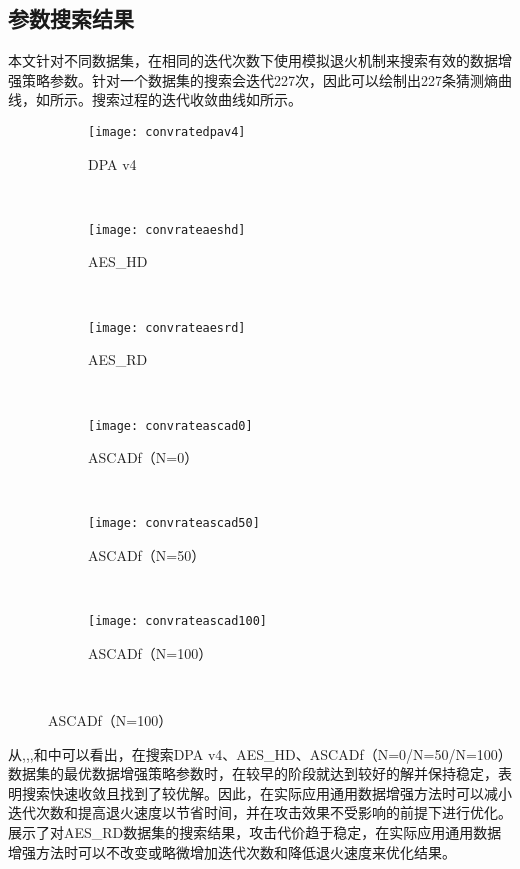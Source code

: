 {	\subsection{参数搜索结果}
	本文针对不同数据集，在相同的迭代次数下使用模拟退火机制来搜索有效的数据增强策略参数。针对一个数据集的搜索会迭代227次，因此可以绘制出227条猜测熵曲线，如所示。搜索过程的迭代收敛曲线如所示。
	\begin{figure}[!htbp]
		\centering
		\begin{subfigure}[b]{\trif\textwidth}
			\texttt{[image: convratedpav4]}
			\caption{DPA v4}
			\label{fig:convratedpav4}
		\end{subfigure}%
		~%
		\begin{subfigure}[b]{\trif\textwidth}
			\texttt{[image: convrateaeshd]}
			\caption{AES\_HD}
			\label{fig:convrateaeshd}
		\end{subfigure}
		~%
		\begin{subfigure}[b]{\trif\textwidth}
			\texttt{[image: convrateaesrd]}
			\caption{AES\_RD}
			\label{fig:convrateaesrd}
		\end{subfigure}
		\\%
		\begin{subfigure}[b]{\trif\textwidth}
			\texttt{[image: convrateascad0]}
			\caption{ASCADf（N=0）}
			\label{fig:convrateascad0}
		\end{subfigure}%
		~%
		\begin{subfigure}[b]{\trif\textwidth}
			\texttt{[image: convrateascad50]}
			\caption{ASCADf（N=50）}
			\label{fig:convrateascad50}
		\end{subfigure}
		~%
		\begin{subfigure}[b]{\trif\textwidth}
			\texttt{[image: convrateascad100]}
			\caption{ASCADf（N=100）}
			\label{fig:convrateascad100}
		\end{subfigure}
		\\%
		\label{fig:convrateit}
	\end{figure}
	
	从,,,和中可以看出，在搜索DPA v4、AES\_HD、ASCADf（N=0/N=50/N=100）数据集的最优数据增强策略参数时，在较早的阶段就达到较好的解并保持稳定，表明搜索快速收敛且找到了较优解。因此，在实际应用通用数据增强方法时可以减小迭代次数和提高退火速度以节省时间，并在攻击效果不受影响的前提下进行优化。展示了对AES\_RD数据集的搜索结果，攻击代价趋于稳定，在实际应用通用数据增强方法时可以不改变或略微增加迭代次数和降低退火速度来优化结果。
	
}
